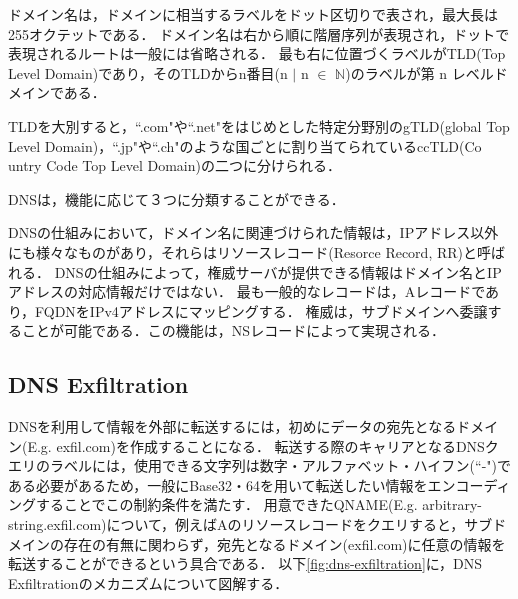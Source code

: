 ドメイン名は，ドメインに相当するラベルをドット区切りで表され，最大長は255オクテットである．
ドメイン名は右から順に階層序列が表現され，ドットで表現されるルートは一般には省略される．
最も右に位置づくラベルがTLD(Top Level Domain)であり，そのTLDからn番目(n $\mid$ n $\in$ $\mathbb{N}$)のラベルが第 n レベルドメインである．

TLDを大別すると，``.com"や``.net"をはじめとした特定分野別のgTLD(global Top Level Domain)，``.jp"や``.ch"のような国ごとに割り当てられているccTLD(Co\\untry Code Top Level Domain)の二つに分けられる．

DNSは，機能に応じて３つに分類することができる．

DNSの仕組みにおいて，ドメイン名に関連づけられた情報は，IPアドレス以外にも様々なものがあり，それらはリソースレコード(Resorce Record, RR)と呼ばれる．
DNSの仕組みによって，権威サーバが提供できる情報はドメイン名とIPアドレスの対応情報だけではない．
最も一般的なレコードは，Aレコードであり，FQDNをIPv4アドレスにマッピングする．
権威は，サブドメインへ委譲することが可能である．この機能は，NSレコードによって実現される．

\subsection{DNS Exfiltration}
\label{sec:dns-exfiltration}
DNSを利用して情報を外部に転送するには，初めにデータの宛先となるドメイン(E.g. exfil.com)を作成することになる．
転送する際のキャリアとなるDNSクエリのラベルには，使用できる文字列は数字・アルファベット・ハイフン(``-")である必要があるため，一般にBase32・64を用いて転送したい情報をエンコーディングすることでこの制約条件を満たす．
用意できたQNAME(E.g. arbitrary-string.exfil.com)について，例えばAのリソースレコードをクエリすると，サブドメインの存在の有無に関わらず，宛先となるドメイン(exfil.com)に任意の情報を転送することができるという具合である．
以下\ref{fig:dns-exfiltration}に，DNS Exfiltrationのメカニズムについて図解する．


